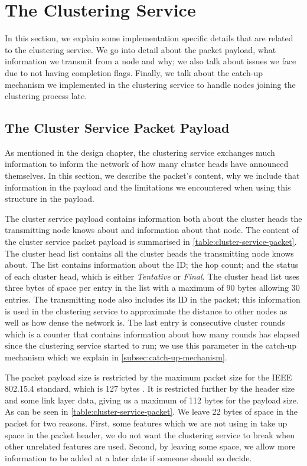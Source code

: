 \section{The Clustering Service}
In this section, we explain some implementation specific details that are related to the clustering service. We go into detail about the packet payload, what information we transmit from a node and why; we also talk about issues we face due to not having completion flags. Finally, we talk about the catch-up mechanism we implemented in the clustering service to handle nodes joining the clustering process late.

\subsection{The Cluster Service Packet Payload}
As mentioned in the design chapter, the clustering service exchanges much information to inform the network of how many cluster heads have announced themselves. In this section, we describe the packet's content, why we include that information in the payload and the limitations we encountered when using this structure in the payload.

The cluster service payload contains information both about the cluster heads the transmitting node knows about and information about that node. The content of the cluster service packet payload is summarised in \cref{table:cluster-service-packet}. The cluster head list contains all the cluster heads the transmitting node knows about. The list contains information about the ID; the hop count; and the status of each cluster head, which is either \emph{Tentative} or \emph{Final}. The cluster head list uses three bytes of space per entry in the list with a maximum of 90 bytes allowing 30 entries. The transmitting node also includes its ID in the packet; this information is used in the clustering service to approximate the distance to other nodes as well as how dense the network is. The last entry is consecutive cluster rounds which is a counter that contains information about how many rounds has elapsed since the clustering service started to run; we use this parameter in the catch-up mechanism which we explain in \cref{subsec:catch-up-mechanism}. 

The packet payload size is restricted by the maximum packet size for the IEEE 802.15.4 standard, which is 127 bytes \cite{IEEE-802-15-4}. It is restricted further by the \atwo{} header size and some link layer data, giving us a maximum of 112 bytes for the payload size. As can be seen in \cref{table:cluster-service-packet}. We leave 22 bytes of space in the packet for two reasons. First, some features which we are not using in \atwo{} take up space in the packet header, we do not want the clustering service to break when other unrelated features are used. Second, by leaving some space, we allow more information to be added at a later date if someone should so decide.

